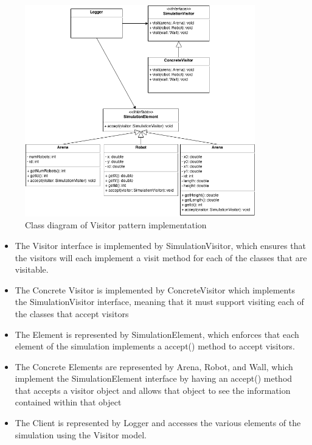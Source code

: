 \documentclass[12pt]{article}
\begin{document}
\begin{figure}[!htb]
  \begin{center}
    \includegraphics[width=100mm]{Visitor.png}
    \caption{Class diagram of Visitor pattern implementation}
    \label{fig:visitor}
  \end{center} 
\end{figure}

\begin{itemize}
\item The Visitor interface is implemented by {\ttfamily SimulationVisitor}, 
  which ensures that the visitors will each implement a visit method for each
  of the classes that are visitable. 
\item The Concrete Visitor is implemented by {\ttfamily ConcreteVisitor} which
  implements the {\ttfamily SimulationVisitor} interface, meaning that it must
  support visiting each of the classes that accept visitors
\item The Element is represented by {\ttfamily SimulationElement}, which 
  enforces that each element of the simulation implements a {\ttfamily accept()}
  method to accept visitors. 
\item The Concrete Elements are represented by {\ttfamily Arena}, 
  {\ttfamily Robot}, and {\ttfamily Wall}, which implement the 
  {\ttfamily SimulationElement} interface by having an {\ttfamily accept()} 
  method that accepts a visitor object and allows that object to see the 
  information contained within that object
\item The Client is represented by {\ttfamily Logger} and accesses the 
  various elements of the simulation using the Visitor model.
\end{itemize}
\end{document}

